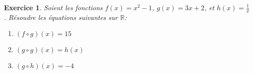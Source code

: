 \documentclass[12pt]{article}
\newtheorem{exercice}{\bf Exercice}
\newtheorem{correction}{\bf Correction exercice}
\newenvironment{exo}{
\begin{exercice}\smallskip\normalfont}{\end{exercice}
}
\newenvironment{cor}{
\begin{correction}\smallskip\normalfont}{\end{correction}
}
\newcommand*{\R}{\mathbb{R}}
\newif\ifcorrige\corrigefalse
\begin{document}


\begin{exo} Soient les fonctions $f(x) = x^2-1$, $g(x) = 3x+2$, et $h(x) = \frac1x$.
  R\'esoudre les \'equations suivantes sur $\R$:
\begin{multicols}{3}
\begin{enumerate}
\item $(f \circ g)(x) = 15$
\item $(g \circ g)(x) = h(x)$
\item $(g \circ h)(x) = -4$
\end{enumerate}
\end{multicols}
\end{exo}

\ifcorrige
\color{magenta}
\begin{cor}
  $\qquad$
\begin{enumerate}
\item On r\'esout ce probl\`eme sur $\R$
  \begin{align*}
    (f \circ g)(x) = 15
    &\iff
    (g(x))^2-1 = 15
    \iff
    (3x+2)^2-1 = 15
    \\
    &\iff
    (3x+2)^2 = 16
    \iff
    3x+2 = -4 \text{  ou  } 3x+2 = 4
    \\
    &\iff 3x = -6 \text{  ou  } 3x = 2
    \iff x = -2 \text{  ou  } x = \frac23
  \end{align*}
  On a trouv\'e deux solutions \`a cette \'equation : $\{-2,\frac23\}$.
  V\'erifions ce r\'esultat:
  $(f \circ g)(-2) = f(g(-2)) = f(-4) = 15$
  et $(f \circ g)(\frac23) = f(g(\frac23)) = f(4) = 15$
\item On r\'esout ce probl\`eme sur $\R \setminus \{ 0 \}$
  (car $h$ non d\'efinie en $0$).
  \begin{align*}
    (g \circ g)(x) = h(x)
    &\iff
    3(3x+2)+2 = \frac1x
    \iff
    9x+8 = \frac1x
    \\
    &\iff
    (9x+8)x = 1
    \iff
    9x^2+8x -1 = 0
  \end{align*}
  Cherchons les racines \'eventuelles de ce polyn\^ome.
  On calcule son discriminant:
  $\Delta = 64 - 4 \times 9 \times (-1) = 100 > 0$.
  Ce polyn\^ome admet donc deux racines r\'eelles:
  $x_1 = \frac{-8 -10}{2 \times 9} = -1$ et $x_2 = \frac{-8+10}{2 \times 9} = \frac19$.
  Ces racines sont non nulles (rappelez-vous qu'on cherche des solutions sur $\R \setminus \{ 0 \}$),
  elles sont donc solutions de l'\'equation.

\item On cherche des solutions sur $\R^*$ (car $h$ est d\'efinie sur $\R^*$)
  \begin{align*}
    (g \circ h)(x) = -4
    \iff
    \frac3x + 2 = -4
    \iff
    \frac3x = -6
    \iff
    \frac1x = -2
    \iff
    x = - \frac12
  \end{align*}
  et $- \frac12 \in \R^*$, donc cette \'equation admet pour unique solution $- \frac12$.
\end{enumerate}
\end{cor}
\color{black}
\fi
\end{document}
